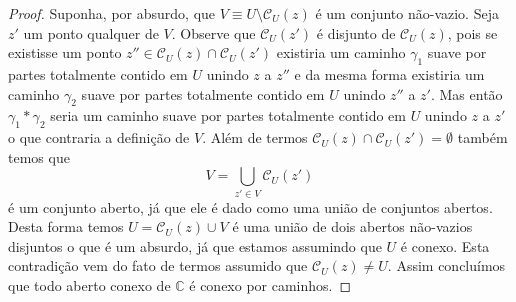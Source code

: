 \begin{proof}
Suponha, por absurdo, que 
$V\equiv U\setminus \mathscr{C}_{U}(z)$ é um conjunto não-vazio.
Seja $z'$ um ponto qualquer de $V$. Observe que $\mathscr{C}_{U}(z')$ 
é disjunto de $\mathscr{C}_{U}(z)$, pois se existisse 
um ponto $z''\in \mathscr{C}_{U}(z)\cap \mathscr{C}_{U}(z')$ 
existiria um caminho $\gamma_1$ suave por partes totalmente contido em $U$ unindo
$z$ a $z''$ e da mesma forma existiria um caminho $\gamma_2$ suave por partes 
totalmente contido em $U$ unindo $z''$ a $z'$. Mas então $\gamma_1*\gamma_2$
seria um caminho suave por partes totalmente contido em $U$ unindo $z$ a $z'$ 
o que contraria a definição de $V$.
Além de termos $\mathscr{C}_{U}(z)\cap \mathscr{C}_{U}(z')=\emptyset$ também temos que 
\[
V = \bigcup_{z'\in V} \mathscr{C}_{U}(z')
\]
é um conjunto aberto, já que ele é dado como uma união de conjuntos abertos. 
Desta forma temos $U=\mathscr{C}_{U}(z)\cup V$ é uma união de dois abertos não-vazios 
disjuntos o que é um absurdo, já que estamos assumindo que $U$ é conexo. 
Esta contradição vem do fato de termos assumido 
que $\mathscr{C}_{U}(z)\neq U$. Assim concluímos que todo aberto
conexo de $\mathbb{C}$ é conexo por caminhos. 


\end{proof}
